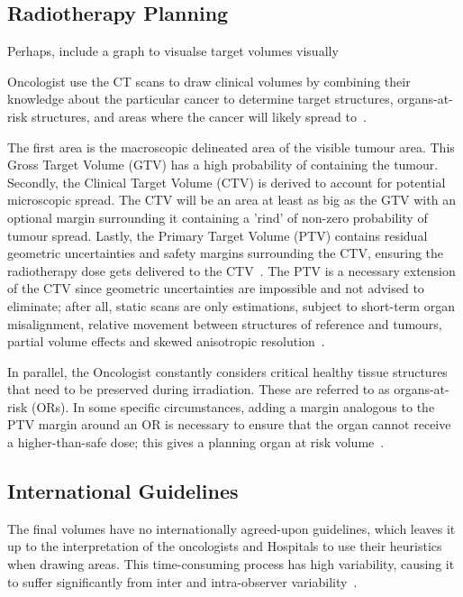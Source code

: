 \documentclass[12pt,twoside]{report}
\begin{document}
\subsection{Radiotherapy Planning}\label{sect:radiotherapy-planning}

\begin{warning}
  Perhaps, include a graph to visualse target volumes visually
\end{warning}

Oncologist use the CT scans to draw clinical volumes by combining their knowledge about the particular cancer to determine target structures, organs-at-risk structures, and areas where the cancer will likely spread to~\cite{AMLART-data}. 

The first area is the macroscopic delineated area of the visible tumour area. This Gross Target Volume (GTV) has a high probability of containing the tumour. Secondly, the Clinical Target Volume (CTV) is derived to account for potential microscopic spread. The CTV will be an area at least as big as the GTV with an optional margin surrounding it containing a 'rind' of non-zero probability of tumour spread. Lastly, the Primary Target Volume (PTV) contains residual geometric uncertainties and safety margins surrounding the CTV, ensuring the radiotherapy dose gets delivered to the CTV~\cite{tumor-delineation,defining-target-volumes,Lin2021-oz,personalised-PTV-strategies}. The PTV is a necessary extension of the CTV since geometric uncertainties are impossible and not advised to eliminate; after all, static scans are only estimations, subject to short-term organ misalignment, relative movement between structures of reference and tumours, partial volume effects and skewed anisotropic resolution~\cite{VANHERK200452}.

In parallel, the Oncologist constantly considers critical healthy tissue structures that need to be preserved during irradiation. These are referred to as organs-at-risk (ORs). In some specific circumstances, adding a margin analogous to the PTV margin around an OR is necessary to ensure that the organ cannot receive a higher-than-safe dose; this gives a planning organ at risk volume~\cite{defining-target-volumes}.

\subsection{International Guidelines}

The final volumes have no internationally agreed-upon guidelines, which leaves it up to the interpretation of the oncologists and Hospitals to use their heuristics when drawing areas. This time-consuming process has high variability, causing it to suffer significantly from inter and intra-observer variability~\cite{Lin2021-oz}. 
\end{document}
